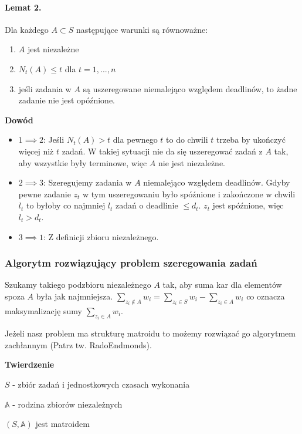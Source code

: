\paragraph{Lemat 2.} 
Dla każdego $A \subset S$ następujące warunki są równoważne:
\begin{enumerate}
	\item $A$ jest niezależne
	\item $N_t(A) \leq t$ dla $t = 1,...,n$
	\item jeśli zadania w $A$ są uszeregowane niemalejąco względem deadlinów, to żadne zadanie nie jest opóźnione.
\end{enumerate}  

\textbf{Dowód}
\begin{itemize}
	\item{ $1 \implies 2$: 
	Jeśli $N_t(A) > t$ dla pewnego $t$ to do chwili $t$ trzeba by ukończyć więcej niż $t$ zadań. W takiej sytuacji nie da się uszeregować zadań z $A$ tak, aby wszystkie były terminowe, więc $A$ nie jest niezależne.}
	\item{ $2 \implies 3$: 
	Szeregujemy zadania w $A$ niemalejąco względem deadlinów. Gdyby pewne zadanie $z_t$ w tym uszeregowaniu było spóźnione i zakończone w chwili $l_t$ to byłoby co najmniej $l_t$ zadań o deadlinie $\leq d_t$. $z_t$ jest spóźnione, więc $l_t > d_t$.}
	\item{ $3 \implies 1$: Z definicji zbioru niezależnego.}
\end{itemize}

\subsubsection{Algorytm rozwiązujący problem szeregowania zadań}
Szukamy takiego podzbioru niezależnego $A$ tak, aby suma kar dla elementów spoza $A$ była jak najmniejsza. $\sum_{z_i \not\in A} w_i = \sum_{z_i \in S} w_i - \sum_{z_i \in A} w_i$ co oznacza maksymalizację sumy $\sum_{z_i \in A} w_i$. 

Jeżeli nasz problem ma strukturę matroidu to możemy rozwiązać go algorytmem zachłannym (Patrz tw. RadoEndmonds).

\textbf{Twierdzenie} 

$S$ - zbiór zadań i jednostkowych czasach wykonania 

$\mathbb{A}$ - rodzina zbiorów niezależnych 

$(S,\mathbb{A})$ jest matroidem 



